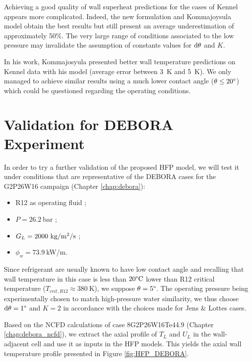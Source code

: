\npar

Achieving a good quality of wall superheat predictions for the cases of Kennel appears more complicated. Indeed, the new formulation and Kommajoysula model obtain the best results but still present an average underestimation of approximately 50\%. The very large range of conditions associated to the low pressure may invalidate the assumption of constants values for $\mathrm{d}\theta$ and $K$. 


\begin{remark*}{}
In his work, Kommajosyula \cite{kommajosyula_development_2020} presented better wall temperature predictions on Kennel data with his model (average error between 3\ K and 5\ K). We only managed to achieve similar results using a much lower contact angle ($\theta \leq 20\degree$) which could be questioned regarding the operating conditions.
\end{remark*}


\clearpage
\section{Validation for DEBORA Experiment}
\label{sec:hfp_valid_debora}

In order to try a further validation of the proposed HFP model, we will test it under conditions that are representative of the DEBORA cases for the G2P26W16 campaign (Chapter \ref{chap:debora}):


\begin{itemize}
\item R12 as operating fluid ;
\item $P=26.2\ $bar ;
\item $G_{L} = 2000~\text{kg/m$^{2}$/s}$ ;
\item $\phi_{w} = 73.9\ $kW/m.
\end{itemize}


Since refrigerant are usually known to have low contact angle and recalling that wall temperature in this case is less than $20\degree\mathrm{C}$ lower than R12 critical temperature ($T_{crit,R12} \approx 380\ $K), we suppose $\theta = 5 \degree$. The operating pressure being experimentally chosen to match high-pressure water similarity, we thus choose $\mathrm{d}\theta = 1 \degree$ and $K = 2$ in accordance with the choices made for Jens \& Lottes cases.

\npar

Based on the NCFD calculations of case 8G2P26W16Te44.9 (Chapter \ref{chap:debora_ncfd}), we extract the axial profile of $T_{L}$ and $U_{L}$ in the wall-adjacent cell and use it as inputs in the HFP models. This yields the axial wall temperature profile presented in Figure \ref{fig:HFP_DEBORA}.


